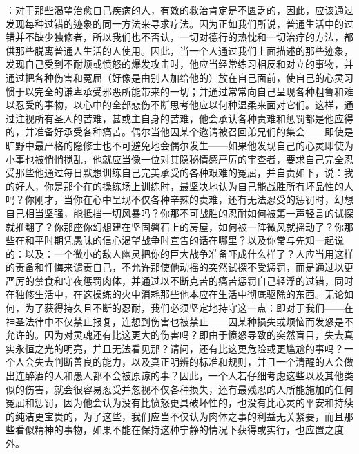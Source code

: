 ：对于那些渴望治愈自己疾病的人，有效的救治肯定是不匮乏的，因此，应该通过发现每种过错的迹象的同一方法来寻求疗法。因为正如我们所说，普通生活中的过错并不缺少独修者，所以我们也不否认，一切对德行的热忱和一切治疗的方法，都供那些脱离普通人生活的人使用。因此，当一个人通过我们上面描述的那些迹象，发现自己受到不耐烦或愤怒的爆发攻击时，他应当经常练习相反和对立的事物，并通过把各种伤害和冤屈（好像是由别人加给他的）放在自己面前，使自己的心灵习惯于以完全的谦卑承受邪恶所能带来的一切；并通过常常向自己呈现各种粗鲁和难以忍受的事物，以心中的全部悲伤不断思考他应以何种温柔来面对它们。这样，通过注视所有圣人的苦难，甚或主自身的苦难，他会承认各种责难和惩罚都是他应得的，并准备好承受各种痛苦。偶尔当他因某个邀请被召回弟兄们的集会——即使是旷野中最严格的隐修士也不可避免地会偶尔发生——如果他发现自己的心灵即使为小事也被悄悄搅乱，他就应当像一位对其隐秘情感严厉的审查者，要求自己完全忍受那些他通过每日默想训练自己完美承受的各种艰难的冤屈，并自责如下，说：我的好人，你是那个在的操练场上训练时，最坚决地认为自己能战胜所有坏品性的人吗？你刚才，当你在心中呈现不仅各种辛辣的责难，还有无法忍受的惩罚时，幻想自己相当坚强，能抵挡一切风暴吗？你那不可战胜的忍耐如何被第一声轻言的试探就推翻了？你那座你幻想建在坚固磐石上的房屋，如何被一阵微风就摇动了？你那些在和平时期凭愚昧的信心渴望战争时宣告的话在哪里？以及你常与先知一起说的：以及：一个微小的敌人幽灵把你的巨大战争准备吓成什么样了？人应当用这样的责备和忏悔来谴责自己，不允许那使他动摇的突然试探不受惩罚，而是通过以更严厉的禁食和守夜惩罚肉体，并通过以不断克苦的痛苦惩罚自己轻浮的过错，同时在独修生活中，在这操练的火中消耗那些他本应在生活中彻底驱除的东西。无论如何，为了获得持久且不断的忍耐，我们必须坚定地持守这一点：即对于我们——在神圣法律中不仅禁止报复，连想到伤害也被禁止——因某种损失或烦恼而发怒是不允许的。因为对灵魂还有比这更大的伤害吗？即由于愤怒导致的突然盲目，失去真实永恒之光的明亮，并且无法看见那？请问，还有比这更危险或更尴尬的事吗？一个人会失去判断善良的能力，以及真正明辨的标准和规则，并且一个清醒的人会做出连醉酒的人和愚人都不会被原谅的事？因此，一个人若仔细考虑这些以及其他类似的伤害，就会很容易忍受并忽视不仅各种损失，还有最残忍的人所能施加的任何冤屈和惩罚，因为他会认为没有比愤怒更具破坏性的，也没有比心灵的平安和持续的纯洁更宝贵的，为了这些，我们应当不仅认为肉体之事的利益无关紧要，而且那些看似精神的事物，如果不能在保持这种宁静的情况下获得或实行，也应置之度外。\par

